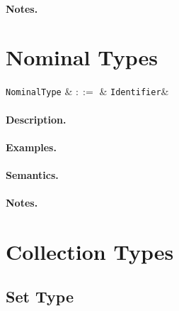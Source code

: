 \paragraph{Notes.}


\section{Nominal Types}

\begin{syntax}
  \verb+NominalType+ & $::=$ & \verb+Identifier+&\\
\end{syntax}

\paragraph{Description.}

\paragraph{Examples.}

\paragraph{Semantics.}

\paragraph{Notes.}


\section{Collection Types}


\subsection{Set Type}

